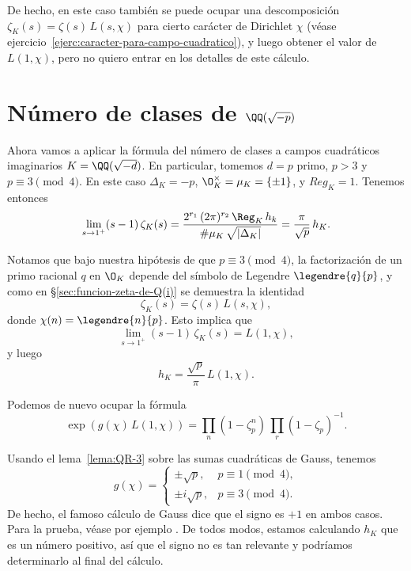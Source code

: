 De hecho, en este caso también se puede ocupar una descomposición
$\zeta_K (s) = \zeta (s) \, L (s,\chi)$ para cierto carácter de Dirichlet $\chi$
(véase ejercicio~\ref{ejerc:caracter-para-campo-cuadratico}), y luego obtener
el valor de $L (1,\chi)$, pero no quiero entrar en los detalles de este cálculo.


\section{Número de clases de \texorpdfstring{$\QQ (\sqrt{-p})$}{ℚ(√−p)}}

Ahora vamos a aplicar la fórmula del número de clases a campos cuadráticos
imaginarios $K = \QQ (\sqrt{-d})$. En particular, tomemos $d = p$ primo, $p > 3$
y $p \equiv 3 \pmod{4}$. En este caso $\Delta_K = -p$, $\O_K^\times = \mu_K = \{ \pm 1 \}$,
y $Reg_K = 1$. Tenemos entonces
\[ \lim_{s \to 1^+} (s - 1)\,\zeta_K (s) =
   \frac{2^{r_1}\,(2\pi)^{r_2}\,\Reg_K\,h_k}{\#\mu_K\,\sqrt{|\Delta_K|}} =
   \frac{\pi}{\sqrt{p}}\,h_K. \]

Notamos que bajo nuestra hipótesis de que $p \equiv 3\pmod{4}$, la factorización
de un primo racional $q$ en $\O_K$ depende del símbolo de Legendre
$\legendre{q}{p}$, y como en \S\ref{sec:funcion-zeta-de-Q(i)} se demuestra la
identidad
$$\zeta_K (s) = \zeta (s)\,L (s,\chi),$$
donde $\chi (n) = \legendre{n}{p}$. Esto implica que
$$\lim_{s \to 1^+} (s - 1)\,\zeta_K (s) = L (1,\chi),$$
y luego
$$h_K = \frac{\sqrt{p}}{\pi}\,L (1,\chi).$$

Podemos de nuevo ocupar la fórmula
$$\exp (g (\chi)\,L(1,\chi)) = \prod_n (1 - \zeta_p^n)\,\prod_r (1 - \zeta_p)^{-1}.$$

Usando el lema~\ref{lema:QR-3} sobre las sumas cuadráticas de Gauss, tenemos
\[ g (\chi) = \begin{cases}
  \pm\sqrt{p}, & p \equiv 1 \pmod{4},\\
  \pm i\sqrt{p}, & p \equiv 3 \pmod{4}.
\end{cases} \]
De hecho, el famoso cálculo de Gauss dice que el signo es $+1$ en ambos
casos. Para la prueba, véase por ejemplo \cite[Chapter~6]{Ireland-Rosen}.
De todos modos, estamos calculando $h_K$ que es un número positivo, así que
el signo no es tan relevante y podríamos determinarlo al final del cálculo.

